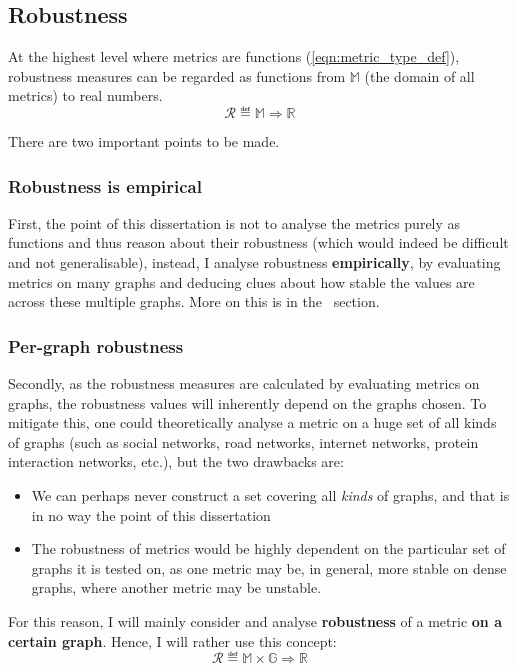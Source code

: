 \subsection{Robustness}

At the highest level where metrics are functions (\autoref{eqn:metric_type_def}), robustness measures can be regarded as functions from $\mathbb{M}$ (the domain of all metrics) to real numbers.
\begin{equation}
    \mathcal{R} \eqdef \mathbb{M} \Rightarrow \mathbb{R}
\end{equation}

There are two important points to be made.

\subsubsection*{Robustness is empirical}

First, the point of this dissertation is not to analyse the metrics purely as functions and thus reason about their robustness (which would indeed be difficult and not generalisable), instead, I analyse robustness \textbf{empirically}, by evaluating metrics on many graphs and deducing clues about how stable the values are across these multiple graphs.
More on this is in the~ section.

\subsubsection*{Per-graph robustness}

Secondly, as the robustness measures are calculated by evaluating metrics on graphs, the robustness values will inherently depend on the graphs chosen.
To mitigate this, one could theoretically analyse a metric on a huge set of all kinds of graphs (such as social networks, road networks, internet networks, protein interaction networks, etc.), but the two drawbacks are:
\begin{itemize}
    \item We can perhaps never construct a set covering all \textsl{kinds} of graphs, and that is in no way the point of this dissertation
    \item The robustness of metrics would be highly dependent on the particular set of graphs it is tested on, as one metric may be, in general, more stable on dense graphs, where another metric may be unstable.
\end{itemize}

For this reason, I will mainly consider and analyse \textbf{robustness} of a metric \textbf{on a certain graph}.
Hence, I will rather use this concept:
\begin{equation}
    \mathcal{R} \eqdef \mathbb{M} \times \mathbb{G} \Rightarrow \mathbb{R}
\end{equation}

